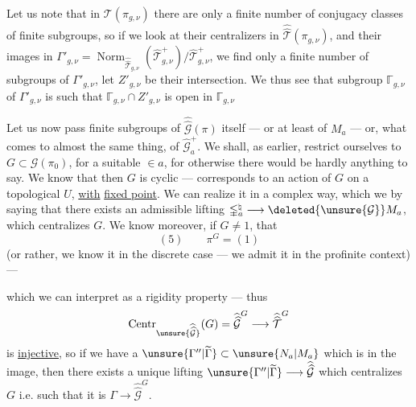 Let us note that in $\mathcal T(\pi_{g,\nu})$ there are
only a finite number of conjugacy classes
of finite subgroups, so if we
look at their centralizers  in
$\widehat{\widehat{\mathcal T}}(\pi_{g,\nu})$, and their images in
$\Gamma'_{g,\nu}=\operatorname{Norm}_{\widehat{\widehat{\mathcal T}}_{g,\nu}}(\widehat{\mathcal T}^{+}_{g,\nu})/\widehat{\mathcal T}^{+}_{g,\nu}$, we
find only a finite number of subgroups
of $\Gamma'_{g,\nu}$, let $Z'_{g,\nu}$ be their intersection.
We thus see that  subgroup $\mathbb{\Gamma}_{g,\nu}$
of $\Gamma'_{g,\nu}$ is such that $\mathbb{\Gamma}_{g,\nu}\cap Z'_{g,\nu}$ is
open in $\mathbb{\Gamma}_{g,\nu}$


Let us now pass  finite
subgroups of $\widehat{\widehat{\mathcal G}}(\pi)$ itself --- or at least
of $M_a$ --- or, what comes to almost the
same thing, of $\widehat{\mathcal G}^{+}_a$. We shall, as
earlier, restrict ourselves to $G\subset\mathcal G(\pi_0)$,
for a suitable  $\in a$,
for otherwise there would be hardly anything to
say. We know that then $G$ is
cyclic ---  corresponds to an action
of $G$ on a topological $U$, \uline{with}
\uline{fixed point}. We can realize it in
a complex way, which we  by
saying that there exists an admissible
lifting $\mathbb{\Gamma}_a^{\natural}\longrightarrow\deleted{\unsure{\mathcal G}} M_a$, which
centralizes $G$. We know moreover, if
$G\ne1$, that \deleted{$\unsure{\pi}$}
\[
(5)\qquad \pi^G=(1)
\]
(or rather, we know it in the discrete case ---
we admit it in the profinite context) ---


which we can  interpret as a rigidity property --- thus
\[
\operatorname{Centr}_{\unsure{\widehat{\widehat{\mathcal G}}}}(G)
=\widehat{\widehat{\mathcal G}}^{G}
\longrightarrow\widehat{\widehat{\mathcal T}}^{G}
\]
is \uline{injective}, so if we have a $\unsure{\Gamma''|\widetilde{\Gamma}}\subset\unsure{N_a|M_a}$ which is in the image, then there exists a unique lifting $\unsure{\Gamma''|\widetilde{\Gamma}}\longrightarrow\widehat{\widehat{\mathcal G}}$ which centralizes $G$ i.e. such that it is $\Gamma\longrightarrow\widehat{\widehat{\mathcal G}}^{G}$.

